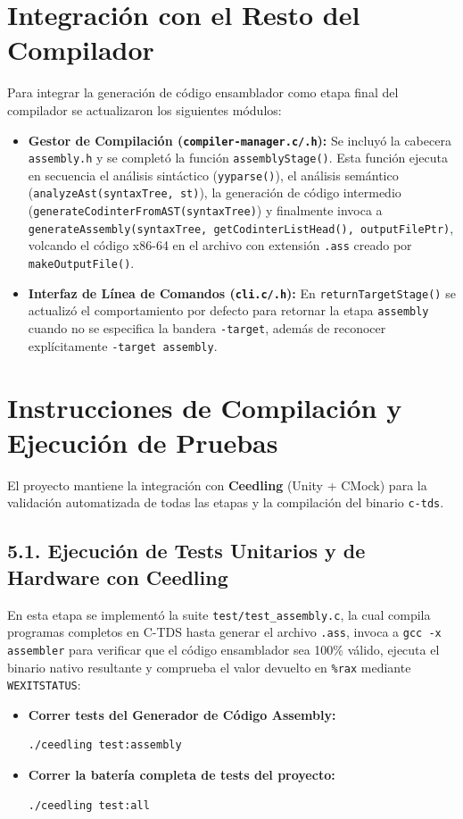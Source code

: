 \documentclass[12pt, a4paper]{article}
\begin{document}
\section{Integración con el Resto del Compilador}
Para integrar la generación de código ensamblador como etapa final del compilador se actualizaron los siguientes módulos:

\begin{itemize}
    \item \textbf{Gestor de Compilación (\texttt{compiler-manager.c/.h}):} Se incluyó la cabecera \texttt{assembly.h} y se completó la función \texttt{assemblyStage()}. Esta función ejecuta en secuencia el análisis sintáctico (\texttt{yyparse()}), el análisis semántico (\texttt{analyzeAst(syntaxTree, st)}), la generación de código intermedio (\texttt{generateCodinterFromAST(syntaxTree)}) y finalmente invoca a \texttt{generateAssembly(syntaxTree, getCodinterListHead(), outputFilePtr)}, volcando el código x86-64 en el archivo con extensión \texttt{.ass} creado por \texttt{makeOutputFile()}.
    \item \textbf{Interfaz de Línea de Comandos (\texttt{cli.c/.h}):} En \texttt{returnTargetStage()} se actualizó el comportamiento por defecto para retornar la etapa \texttt{assembly} cuando no se especifica la bandera \texttt{-target}, además de reconocer explícitamente \texttt{-target assembly}.
\end{itemize}

\section{Instrucciones de Compilación y Ejecución de Pruebas}
El proyecto mantiene la integración con \textbf{Ceedling} (Unity + CMock) para la validación automatizada de todas las etapas y la compilación del binario \texttt{c-tds}.

\subsection*{5.1. Ejecución de Tests Unitarios y de Hardware con Ceedling}
En esta etapa se implementó la suite \texttt{test/test\_assembly.c}, la cual compila programas completos en C-TDS hasta generar el archivo \texttt{.ass}, invoca a \texttt{gcc -x assembler} para verificar que el código ensamblador sea 100\% válido, ejecuta el binario nativo resultante y comprueba el valor devuelto en \texttt{\%rax} mediante \texttt{WEXITSTATUS}:

\begin{itemize}
    \item \textbf{Correr tests del Generador de Código Assembly:}
\begin{verbatim}
./ceedling test:assembly
\end{verbatim}
    \item \textbf{Correr la batería completa de tests del proyecto:}
\begin{verbatim}
./ceedling test:all
\end{verbatim}
\end{itemize}
\end{document}
